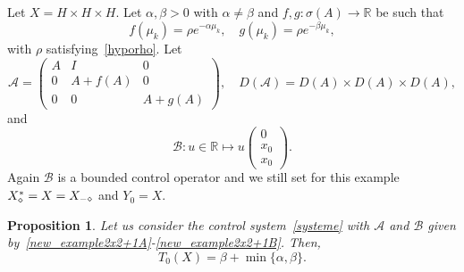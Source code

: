 \documentclass[11pt]{article}
\newtheorem{prop}[theo]{Proposition}
\theoremstyle{definition}
\numberwithin{equation}{section}
\numberwithin{figure}{section}
\numberwithin{table}{section}
\newcommand\A{\mathcal{A}}
\newcommand\B{\mathcal{B}}
\newcommand{\DA}{D(\A)}
\newcommand{\Xalphas}{X_\diamond^*}
\newcommand{\Xmalpha}{X_{-\diamond}}
\newcommand{\Fzp}{Y_0}
\newcommand{\R}{\mathbb{R}}
\begin{document}
Let $X=H\times H\times H$. Let $\alpha,\beta>0$ with $\alpha\neq\beta$ and $f, g : \sigma(A) \to \R$ be such that
\[
f(\mu_k) = \rho e^{-\alpha \mu_k},
\quad g(\mu_k) = \rho e^{-\beta \mu_k},
\]
with $\rho$ satisfying~\eqref{hyporho}. Let
\begin{equation}\label{new_example2x2+1A}
\A=
\begin{pmatrix} A & I & 0 \\ 0 & A+f(A) & 0 \\ 0 & 0 &A+g(A)
\end{pmatrix},
\quad
\DA=D(A)\times D(A)\times D(A),
\end{equation}
and
\begin{equation}\label{new_example2x2+1B}
\B : u \in \R \mapsto u
\begin{pmatrix} 0 \\ x_0 \\ x_0
\end{pmatrix}.
\end{equation}
Again $\B$ is a bounded control operator and we still set for this example $\Xalphas = X\linebreak=\Xmalpha$ and $\Fzp=X$.

\begin{prop}\label{Prop:Academique3}
Let us consider the control system~\eqref{systeme} with $\A$ and $\B$ given by~\eqref{new_example2x2+1A}-\eqref{new_example2x2+1B}. Then,
\[
T_0(X) = \beta + \min\{ \alpha, \beta \}.
\]
\end{prop}
\end{document}
